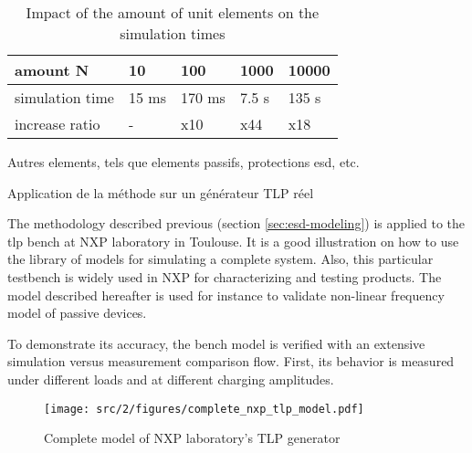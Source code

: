 \begin{table}[!h]
\centering
\begin{tabular}{@{}lllll@{}}
\toprule
amount N         &  10           & 100        &  1000      &   10000    \\ \midrule
simulation time  &  15 ms        & 170 ms     &  7.5 s     &   135 s    \\
increase ratio   &  -            & x10        &  x44       &   x18      \\
\bottomrule
\end{tabular}
\caption{Impact of the amount of unit elements on the simulation times}
\label{tab:tline-impact-simulation-time}
\end{table}

Autres elements, tels que elements passifs, protections esd, etc.

Application de la méthode sur un générateur TLP réel

The methodology described previous (section \ref{sec:esd-modeling}) is applied to the \gls{tlp} bench at NXP laboratory in Toulouse.
It is a good illustration on how to use the library of models for simulating a complete system.
Also, this particular testbench is widely used in NXP for characterizing and testing products.
The model described hereafter is used for instance to validate non-linear frequency model of passive devices.

To demonstrate its accuracy, the bench model is verified with an extensive simulation versus measurement comparison flow.
First, its behavior is measured under different loads and at different charging amplitudes.


\begin{figure}[!h]
  \centering
  \texttt{[image: src/2/figures/complete\_nxp\_tlp\_model.pdf]}
  \caption{Complete model of NXP laboratory's TLP generator}
  \label{fig:complete-tlp-model}
\end{figure}

